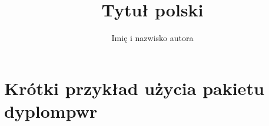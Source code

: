 \documentclass[magister,druk,polski]{dyplompwr}
\author{Imię i nazwisko autora}
\title{Tytuł  polski}
\begin{document}

\maketitle          %
\tableofcontents    %
\listoffigures      %
\listoftables       %

\chapter{Krótki przykład użycia pakietu dyplompwr}
\lipsum
\end{document}
